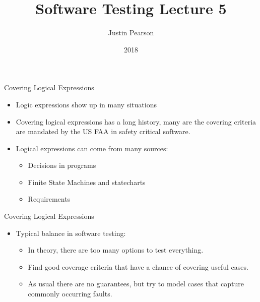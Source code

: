 \documentclass{beamer}
\title{Software Testing  Lecture 5}
\author{Justin Pearson}
\date{2018}
\begin{document}
\lstset{language=C}

\begin{frame}
  \maketitle
\end{frame}

\begin{frame}{Covering Logical Expressions}
  \begin{itemize}
  \item Logic expressions show up in many situations
  \item Covering logical expressions has a long history, many are the
    covering criteria are mandated by the US FAA in safety critical
    software.
  \item Logical expressions can come from many sources:
    \begin{itemize}
    \item Decisions in programs
    \item Finite State Machines and statecharts 
    \item Requirements
    \end{itemize}
  \end{itemize}
  
\end{frame}
\begin{frame}{Covering Logical Expressions}
  \begin{itemize}
  \item Typical balance in software testing:
    \begin{itemize}
    \item In theory, there are too many options to test everything.
    \item Find good coverage criteria that have a chance of covering
      useful cases.
    \item As usual there are no guarantees, but try to model cases that
      capture commonly occurring faults.
    \end{itemize}
  \end{itemize}  
\end{frame}
\end{document}
